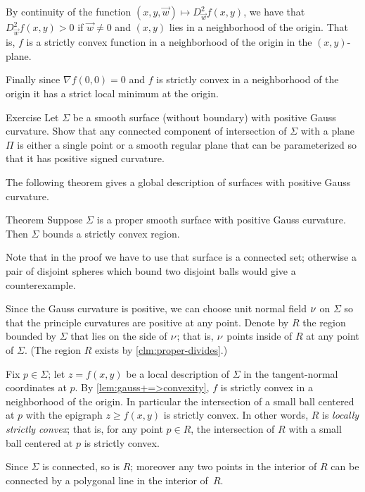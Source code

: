 By continuity of the function $(x,y,{\vec w})\mapsto D^2_{\vec w}f(x,y)$,
we have that $D^2_{\vec w}f(x,y)>0$ if $\vec w\ne 0$ and $(x,y)$ lies in a neighborhood of the origin.
That is, $f$ is a strictly convex function in a neighborhood of the origin in the $(x,y)$-plane.

Finally since $\nabla f(0,0)=0$ and $f$ is strictly convex in a neighborhood of the origin it has a strict local minimum at the origin.
\qeds

\begin{thm}{Exercise}\label{ex:section-of-convex}
Let $\Sigma$ be a smooth surface (without boundary) with positive Gauss curvature.
Show that any connected component of intersection of $\Sigma$ with a plane $\Pi$ is either a single point or a smooth regular plane that can be parameterized so that it has positive signed curvature.
\end{thm}

The following theorem gives a global description of surfaces with positive Gauss curvature.

\begin{thm}{Theorem}\label{thm:convex-embedded}
Suppose $\Sigma$ is a proper smooth surface with positive Gauss curvature.
Then $\Sigma$ bounds a strictly convex region.
\end{thm}

Note that in the proof we have to use that surface is a connected set;
otherwise a pair of disjoint spheres which bound two disjoint balls would give a counterexample.

Since the Gauss curvature is positive, we can choose unit normal field $\nu$ on $\Sigma$ so that the principle curvatures are positive at any point.
Denote by $R$ the region bounded by $\Sigma$ that lies on the side of $\nu$;
that is, $\nu$ points inside of $R$ at any point of $\Sigma$.
(The region $R$ exists by \ref{clm:proper-divides}.)

Fix $p\in\Sigma$; let $z=f(x,y)$ be a local description of $\Sigma$ in the tangent-normal coordinates at $p$.
By \ref{lem:gauss+=>convexity}, $f$ is strictly convex in a neighborhood of the origin.
In particular the intersection of a small ball centered at $p$ with the epigraph $z\ge f(x,y)$ is strictly convex.
In other words, $R$ is \emph{locally strictly convex};
that is, for any point $p\in R$, the intersection of $R$ with a small ball centered at $p$ is strictly convex.

Since $\Sigma$ is connected, so is $R$;
moreover any two points in the interior of $R$ can be connected by a polygonal line in the interior of~$R$.

